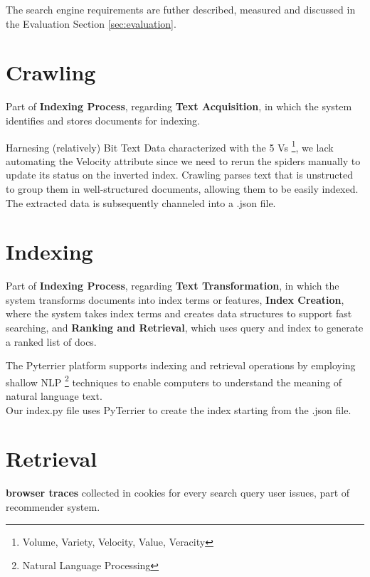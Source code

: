 \documentclass[12pt]{spieman}  %
\begin{document}
\begin{spacing}{1}
    The search engine requirements are futher described, measured and discussed
    in the Evaluation Section \ref{sec:evaluation}.

    \section{Crawling}\label{sec:crawling}
    Part of \textbf{Indexing Process}, regarding \textbf{Text Acquisition}, in which the system
    identifies and stores documents for indexing.

    Harnesing (relatively) Bit Text Data characterized with the 5
    Vs \footnote{Volume, Variety, Velocity, Value, Veracity},
    we lack automating the Velocity attribute since we need to rerun the spiders manually to update its
    status on the inverted index.
    Crawling parses text that is unstructed to group them in well-structured documents, allowing them to be
    easily indexed.
    The extracted data is subsequently channeled into a .json file.

    \section{Indexing}\label{sec:indexing}
    Part of \textbf{Indexing Process}, regarding \textbf{Text Transformation}, in which the system
    transforms documents into index terms or features, \textbf{Index Creation}, where the
    system takes index terms and creates data structures to support fast searching,
    and \textbf{Ranking and Retrieval}, which uses query and index to generate a ranked list of docs.

    The Pyterrier platform supports indexing and retrieval operations by employing shallow
    NLP \footnote{Natural Language Processing}
    techniques to enable computers to understand the meaning of natural language text.\\
    Our index.py file uses PyTerrier to create the index starting from the .json file.

    \section{Retrieval}

    \textbf{browser traces} collected in cookies for every search query user issues, part of recommender system.


\end{spacing}
\end{document}
